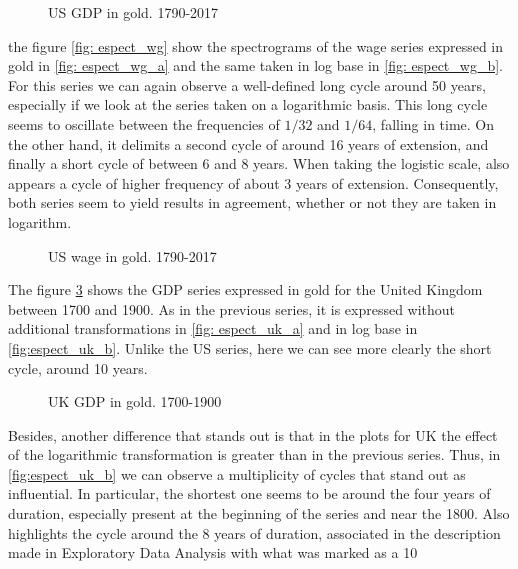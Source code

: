 \documentclass[a4paper]{article}
\begin{document}
\begin{figure}[H]
	\centering
	\caption{US GDP in gold. 1790-2017} \label{fig:espect_PBI}
\end{figure}

the figure \ref{fig: espect_wg} show the spectrograms of the wage series expressed in gold in \ref{fig: espect_wg_a} and the same taken in log base in \ref{fig: espect_wg_b}. For this series we can again observe a well-defined long cycle around 50 years, especially if we look at the series taken on a logarithmic basis. This long cycle seems to oscillate between the frequencies of $1/32$ and $1/64$, falling in time. On the other hand, it delimits a second cycle of around 16 years of extension, and finally a short cycle of between 6 and 8 years. When taking the logistic scale, also appears a cycle of higher frequency of about 3 years of extension. Consequently, both series seem to yield results in agreement, whether or not they are taken in logarithm.


\begin{figure}[H]
	\centering
	\caption{US wage in gold. 1790-2017} \label{fig:espect_wg}
\end{figure}

The figure \ref{fig:espect_uk} shows the GDP series expressed in gold for the United Kingdom between 1700 and 1900. As in the previous series, it is expressed without additional transformations in \ref{fig: espect_uk_a} and in log base in \ref{fig:espect_uk_b}. Unlike the US series, here we can see more clearly the short cycle, around 10 years.

\begin{figure}[H]
	\centering
	\caption{UK GDP in gold. 1700-1900} \label{fig:espect_uk}
\end{figure}

Besides, another difference that stands out is that in the plots for UK the effect of the logarithmic transformation is greater than in the previous series. Thus, in \ref {fig:espect_uk_b} we can observe a multiplicity of cycles that stand out as influential. In particular, the shortest one seems to be around the four years of duration, especially present at the beginning of the series and near the 1800. Also highlights the cycle around the 8 years of duration, associated in the description made in Exploratory Data Analysis with what was marked as a 10
\end{document}
